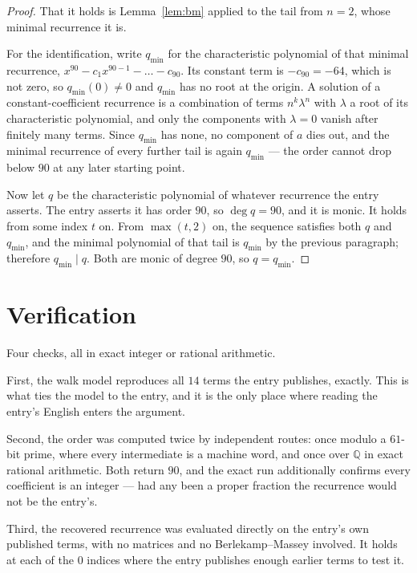 \documentclass[11pt,a4paper]{article}
\theoremstyle{plain}
\theoremstyle{definition}
\begin{document}
\begin{proof}
That it holds is Lemma~\ref{lem:bm} applied to the tail from $n=2$, whose minimal
recurrence it is.

For the identification, write $q_{\min}$ for the characteristic polynomial of that minimal
recurrence, $x^{90}-c_1x^{90-1}-\dots-c_{90}$. Its constant term is
$-c_{90}=-64$, which is not zero, so $q_{\min}(0)\neq0$ and $q_{\min}$ has no
root at the origin. A solution of a constant-coefficient recurrence is a combination of terms
$n^{k}\lambda^{n}$ with $\lambda$ a root of its characteristic polynomial, and only the
components with $\lambda=0$ vanish after finitely many terms. Since $q_{\min}$ has none, no
component of $a$ dies out, and the minimal recurrence of every further tail is again
$q_{\min}$ --- the order cannot drop below $90$ at any later starting point.

Now let $q$ be the characteristic polynomial of whatever recurrence the entry asserts. The
entry asserts it has order $90$, so $\deg q=90$, and it is monic. It holds from some
index $t$ on. From $\max(t,2)$ on, the sequence satisfies both $q$ and $q_{\min}$, and
the minimal polynomial of that tail is $q_{\min}$ by the previous paragraph; therefore
$q_{\min}\mid q$. Both are monic of degree $90$, so $q=q_{\min}$.
\end{proof}

\section{Verification}

Four checks, all in exact integer or rational arithmetic.

First, the walk model reproduces all $14$ terms the entry publishes, exactly. This is
what ties the model to the entry, and it is the only place where reading the entry's English
enters the argument.

Second, the order was computed twice by independent routes: once modulo a $61$-bit prime, where
every intermediate is a machine word, and once over $\mathbb{Q}$ in exact rational arithmetic.
Both return $90$, and the exact run additionally confirms every coefficient is an integer
--- had any been a proper fraction the recurrence would not be the entry's.

Third, the recovered recurrence was evaluated directly on the entry's own published terms, with
no matrices and no Berlekamp--Massey involved. It holds at each of the $0$ indices where
the entry publishes enough earlier terms to test it.
\end{document}
